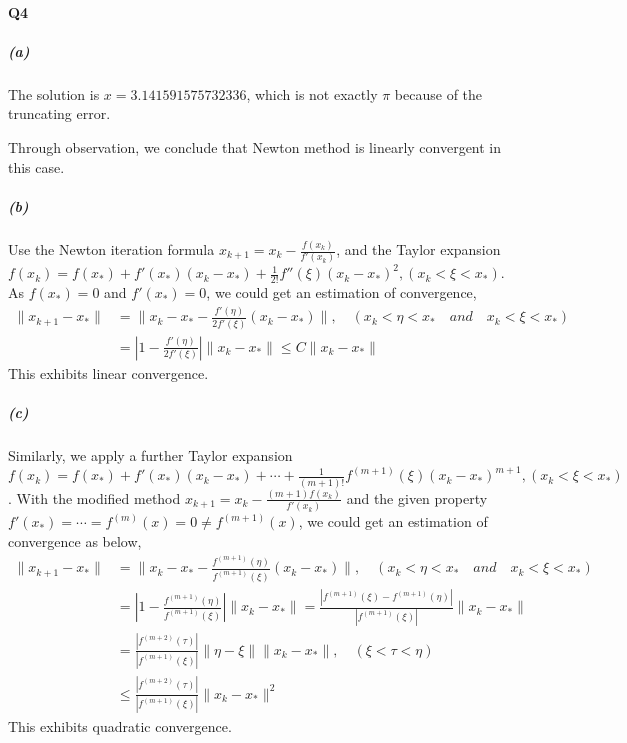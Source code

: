 \documentclass[11pt]{article}
\begin{document}
\paragraph{Q4}
\subparagraph{(a)}
The solution is $x=3.141591575732336$, which is not exactly $\pi$ because of the truncating error.
\begin{figure}[H]
	\centering
\end{figure}
Through observation, we conclude that Newton method is linearly convergent in this case.
\subparagraph{(b)}
Use the Newton iteration formula $x_{k+1}=x_{k}-\frac{f(x_k)}{f'(x_k)}$, and the Taylor expansion $f(x_k)=f(x_*)+f'(x_*)(x_k-x_*)+\frac{1}{2!}f''(\xi)(x_k-x_*)^2, (x_k<\xi<x_*)$. As $f(x_*)=0$ and $f'(x_*)=0$, we could get an estimation of convergence,
\begin{align}
	\|x_{k+1}-x_*\|&=\|x_k-x_*-\frac{f'(\eta)}{2f'(\xi)}(x_k-x_*)\|,\quad (x_k<\eta<x_*\quad and \quad x_k<\xi<x_* ) \\
	&=|1-\frac{f'(\eta)}{2f'(\xi)}|\|x_k-x_*\|\le C\|x_k-x_*\|
\end{align}
This exhibits linear convergence.
\subparagraph{(c)}
Similarly, we apply a further Taylor expansion $f(x_k)=f(x_*)+f'(x_*)(x_k-x_*)+\cdots+\frac{1}{(m+1)!}f^{(m+1)}(\xi)(x_k-x_*)^{m+1}, (x_k<\xi<x_*)$. With the modified method $x_{k+1}=x_k-\frac{(m+1)f(x_k)}{f'(x_k)}$ and the given property $f'(x_*)=\cdots=f^{(m)}(x)=0\ne f^{(m+1)}(x)$, we could get an estimation of convergence as below,
\begin{align}
	\|x_{k+1}-x_*\|&=\|x_k-x_*-\frac{f^{(m+1)}(\eta)}{f^{(m+1)}(\xi)}(x_k-x_*)\|,\quad (x_k<\eta<x_*\quad and \quad x_k<\xi<x_* ) \\
	&=|1-\frac{f^{(m+1)}(\eta)}{f^{(m+1)}(\xi)}|\|x_k-x_*\|
	=\frac{|f^{(m+1)}(\xi)-f^{(m+1)}(\eta)|}{|f^{(m+1)}(\xi)|}\|x_k-x_*\|\\
	&=\frac{|f^{(m+2)}(\tau)|}{|f^{(m+1)}(\xi)|}\|\eta-\xi\|\|x_k-x_*\|,\quad (\xi<\tau<\eta)\\
	&\le \frac{|f^{(m+2)}(\tau)|}{|f^{(m+1)}(\xi)|}\|x_k-x_*\|^2
\end{align}
This exhibits quadratic convergence.
\end{document}
